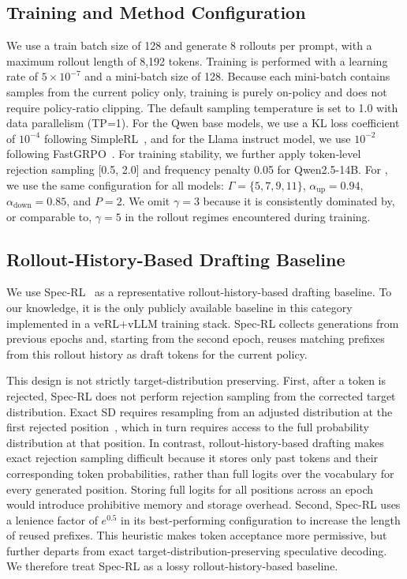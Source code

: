 \subsection{Training and Method Configuration}
\label{app:training_method_config}

We use a train batch size of 128 and generate 8 rollouts per prompt, with a maximum rollout length of 8,192 tokens.
Training is performed with a learning rate of $5\times 10^{-7}$ and a mini-batch size of 128.
Because each mini-batch contains samples from the current policy only, training is purely on-policy and does not require policy-ratio clipping.
The default sampling temperature is set to 1.0 with data parallelism (TP=1).
For the Qwen base models, we use a KL loss coefficient of $10^{-4}$ following SimpleRL~\citep{zeng2025simplerl}, and for the Llama instruct model, we use $10^{-2}$ following FastGRPO~\citep{zhang2025fastgrpo}.
For training stability, we further apply token-level rejection sampling [0.5, 2.0] and frequency penalty 0.05 for Qwen2.5-14B.
For \adaptivepolicy{}, we use the same configuration for all models: $\Gamma=\{5,7,9,11\}$, $\alpha_{\mathrm{up}}=0.94$, $\alpha_{\mathrm{down}}=0.85$, and $P=2$.
We omit $\gamma=3$ because it is consistently dominated by, or comparable to, $\gamma=5$ in the rollout regimes encountered during training.


\subsection{Rollout-History-Based Drafting Baseline}
\label{app:history_drafting}

We use Spec-RL~\cite{liu2025spec} as a representative rollout-history-based drafting baseline.
To our knowledge, it is the only publicly available baseline in this category implemented in a veRL+vLLM training stack.
Spec-RL collects generations from previous epochs and, starting from the second epoch, reuses matching prefixes from this rollout history as draft tokens for the current policy.

This design is not strictly target-distribution preserving.
First, after a token is rejected, Spec-RL does not perform rejection sampling from the corrected target distribution.
Exact SD requires resampling from an adjusted distribution at the first rejected position~\cite{leviathan2023fast}, which in turn requires access to the full probability distribution at that position.
In contrast, rollout-history-based drafting makes exact rejection sampling difficult because it stores only past tokens and their corresponding token probabilities, rather than full logits over the vocabulary for every generated position.
Storing full logits for all positions across an epoch would introduce prohibitive memory and storage overhead.
Second, Spec-RL uses a lenience factor of $e^{0.5}$ in its best-performing configuration to increase the length of reused prefixes.
This heuristic makes token acceptance more permissive, but further departs from exact target-distribution-preserving speculative decoding.
We therefore treat Spec-RL as a lossy rollout-history-based baseline.

